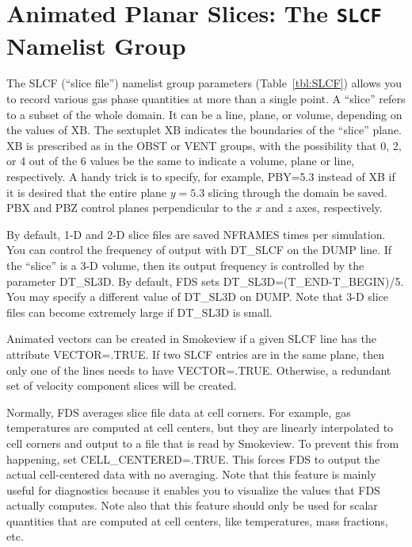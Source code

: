 \documentclass[11pt]{book}
\begin{document}
\section{Animated Planar Slices: The \texorpdfstring{{\tt SLCF}}{SLCF} Namelist Group}
\label{info:SLCF}

The {\ct SLCF} (``slice file'') namelist group parameters (Table~\ref{tbl:SLCF})
allows you to record various gas phase quantities
at more than a single point. A ``slice'' refers to a subset of the whole domain. It can be a line,
plane, or volume, depending on the values of {\ct XB}.
The sextuplet {\ct XB} indicates the boundaries of the ``slice'' plane.
{\ct XB} is prescribed as in the {\ct OBST} or {\ct VENT} groups, with
the possibility that 0, 2, or 4 out of the 6 values be the same to
indicate a volume, plane or line, respectively. A handy trick is to
specify, for example, {\ct PBY=5.3} instead of {\ct XB} if it is desired
that the entire plane $y=5.3$ slicing through the domain be saved.
{\ct PBX} and {\ct PBZ} control planes perpendicular to the
$x$ and $z$ axes, respectively.

By default, 1-D and 2-D slice files are saved {\ct NFRAMES} times per simulation. You can control the frequency of output with {\ct DT\_SLCF} on the {\ct DUMP} line.
If the ``slice'' is a 3-D volume, then its output frequency is controlled by the parameter {\ct DT\_SL3D}.  By default, FDS sets {\ct DT\_SL3D=(T\_END-T\_BEGIN)/5}.  You may specify a different value of {\ct DT\_SL3D} on {\ct DUMP}.  Note that 3-D slice files can become extremely large if {\ct DT\_SL3D} is small.

Animated vectors can be created in Smokeview if a given {\ct SLCF} line has the attribute {\ct VECTOR=.TRUE.} If two {\ct SLCF}
entries are in the same plane, then only one of the lines needs to have {\ct VECTOR=.TRUE.} Otherwise, a redundant set of velocity
component slices will be created.

Normally, FDS averages slice file data at cell corners. For example, gas temperatures are computed at cell centers, but they
are linearly interpolated to cell corners and output to a file that is read by Smokeview. To prevent this from happening,
set {\ct CELL\_CENTERED=.TRUE.} This forces FDS to output the actual cell-centered data with no averaging. Note that this
feature is mainly useful for diagnostics because it enables you to visualize the values that FDS actually computes. Note also that this
feature should only be used for scalar quantities that are computed at cell centers, like temperatures, mass fractions, etc.
\end{document}
